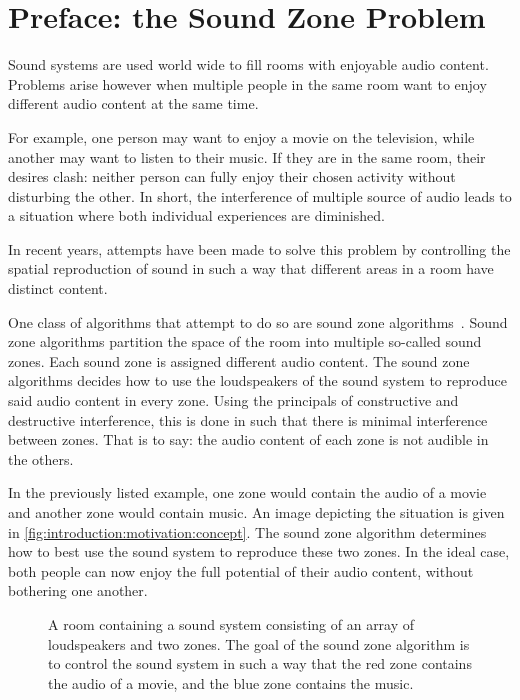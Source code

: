 \section{Preface: the Sound Zone Problem}
\label{ch:introduction:preface}
Sound systems are used world wide to fill rooms with enjoyable audio content. 
Problems arise however when multiple people in the same room want to enjoy different audio content at the same time.

For example, one person may want to enjoy a movie on the television, while another may want to listen to their music.
If they are in the same room, their desires clash: neither person can fully enjoy their chosen activity without disturbing
the other.
In short, the interference of multiple source of audio leads to a situation where both individual experiences are diminished.

In recent years, attempts have been made to solve this problem by controlling the spatial reproduction of sound in such
a way that different areas in a room have distinct content.

One class of algorithms that attempt to do so are sound zone algorithms~\cite{betlehem2015personal}.
Sound zone algorithms partition the space of the room into multiple so-called sound zones.
Each sound zone is assigned different audio content.
The sound zone algorithms decides how to use the loudspeakers of the sound system to reproduce said audio content in every zone.
Using the principals of constructive and destructive interference, this is done in such that there is minimal interference between zones.
That is to say: the audio content of each zone is not audible in the others.

In the previously listed example, one zone would contain the audio of a movie and another zone would contain music.
An image depicting the situation is given in \autoref{fig:introduction:motivation:concept}.
The sound zone algorithm determines how to best use the sound system to reproduce these two zones.
In the ideal case, both people can now enjoy the full potential of their audio content, without bothering one another.

\begin{figure}[]
    \centering
    \scalebox{1.0}{}
    \caption{A room containing a sound system consisting of an array of loudspeakers and two zones.
                The goal of the sound zone algorithm is to control the sound system in such a way that the red zone
                contains the audio of a movie, and the blue zone contains the music.}
    \label{fig:introduction:motivation:concept}
\end{figure}

